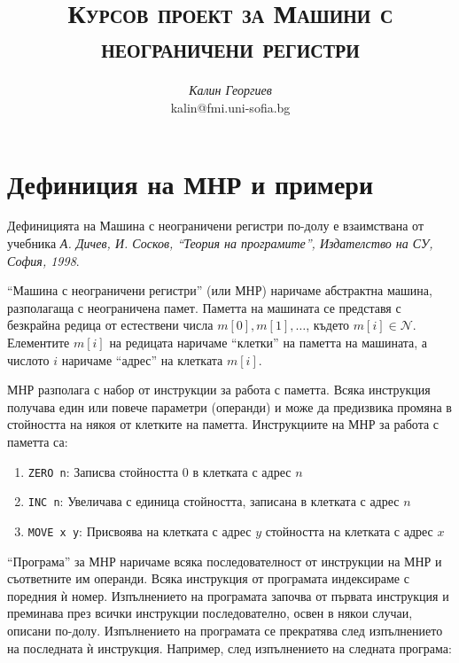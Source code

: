 \documentclass[12pt,a4paper]{article}
\author{\textit{Калин Георгиев}\\
\small{kalin@fmi.uni-sofia.bg}}
\title{\textsc{Курсов проект за Машини с неограничени регистри}}
\newcommand{\code}[1]{\texttt{#1}}
\begin{document}
\maketitle

\section {Дефиниция на МНР и примери}

\small{Дефиницията на Машина с неограничени регистри по-долу е взаимствана от учебника \cite{tprog} \textit{А. Дичев, И. Сосков, ``Теория на програмите'', Издателство на СУ, София, 1998}.

\vspace{20px}

\begin{mdframed}[hidealllines=true,backgroundcolor=gray!20]

	``Машина с неограничени регистри'' (или МНР) наричаме абстрактна машина, разполагаща с неограничена памет. Паметта на машината се представя с безкрайна редица от естествени числа $m[0], m[1], \ldots$, където $m[i] \in \mathcal{N}$. Елементите $m[i]$ на редицата наричаме ``клетки'' на паметта на машината, а числото $i$ наричаме ``адрес'' на клетката $m[i]$.

	 МНР разполага с набор от инструкции за работа с паметта. Всяка инструкция получава един или повече параметри (операнди) и може да предизвика промяна в стойността на някоя от клетките на паметта. Инструкциите на МНР за работа с паметта са:

	\begin{enumerate}[label=\arabic*)]
		\item \code{ZERO n}: Записва стойността 0 в клетката с адрес $n$
		\item \code{INC n}: Увеличава с единица стойността, записана в клетката с адрес $n$
		\item \code{MOVE x y}: Присвоява на клетката с адрес $y$ стойността на клетката с адрес $x$
	\end{enumerate}

	``Програма'' за МНР наричаме всяка последователност от инструкции на МНР и съответните им операнди. Всяка инструкция от програмата индексираме с поредния ѝ номер. Изпълнението на програмата започва от първата инструкция и преминава през всички инструкции последователно, освен в някои случаи, описани по-долу. Изпълнението на програмата се прекратява след изпълнението на последната ѝ инструкция. Например, след изпълнението на следната програма:


\end{mdframed}}
\end{document}
